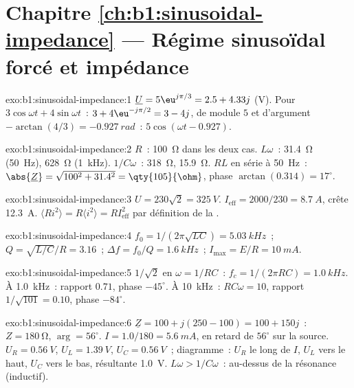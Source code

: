 \section*{Chapitre \ref{ch:b1:sinusoidal-impedance} --- Régime sinusoïdal forcé et impédance}

\begin{solution}{exo:b1:sinusoidal-impedance:1}
$\underline U = 5\eu^{j\pi/3} = 2.5 + 4.33j$ (V). Pour $3\cos\omega t +
4\sin\omega t$~: $3 + 4\eu^{-j\pi/2} = 3 - 4j$, de module $5$ et
d'argument $-\arctan(4/3) = \qty{-0.927}{rad}$~: $5\cos(\omega t - 0.927)$.
\end{solution}

\begin{solution}{exo:b1:sinusoidal-impedance:2}
$R$~: \qty{100}{\ohm} dans les deux cas. $L\omega$~: \qty{31.4}{\ohm} (\qty{50}{Hz}),
\qty{628}{\ohm} (\qty{1}{kHz}). $1/C\omega$~: \qty{318}{\ohm}, \qty{15.9}{\ohm}.
$RL$ en série à \qty{50}{Hz}~: $\abs{\underline Z} = \sqrt{100^2 + 31.4^2} =
\qty{105}{\ohm}$, phase $\arctan(0.314) = 17^\circ$.
\end{solution}

\begin{solution}{exo:b1:sinusoidal-impedance:3}
$U = 230\sqrt2 = \qty{325}{V}$. $I_{\mathrm{eff}} = 2000/230 = \qty{8.7}{A}$,
crête \qty{12.3}{A}. $\langle Ri^2\rangle = R\langle i^2\rangle =
RI_{\mathrm{eff}}^2$ par définition de la .
\end{solution}

\begin{solution}{exo:b1:sinusoidal-impedance:4}
$f_0 = 1/(2\pi\sqrt{LC}) = \qty{5.03}{kHz}$~; $Q = \sqrt{L/C}/R = 3.16$~;
$\Delta f = f_0/Q = \qty{1.6}{kHz}$~; $I_{\max} = E/R = \qty{10}{mA}$.
\end{solution}

\begin{solution}{exo:b1:sinusoidal-impedance:5}
$1/\sqrt2$ en $\omega = 1/RC$~: $f_c = 1/(2\pi RC) = \qty{1.0}{kHz}$. À
\qty{1.0}{kHz}~: rapport $0.71$, phase $-45^\circ$. À \qty{10}{kHz}~:
$RC\omega = 10$, rapport $1/\sqrt{101} = 0.10$, phase $-84^\circ$.
\end{solution}

\begin{solution}{exo:b1:sinusoidal-impedance:6}
$\underline Z = 100 + j(250 - 100) = 100 + 150j$~: $Z = \qty{180}{\ohm}$,
$\arg = 56^\circ$. $I = 1.0/180 = \qty{5.6}{mA}$, en retard de $56^\circ$
sur la source. $U_R = \qty{0.56}{V}$, $U_L = \qty{1.39}{V}$, $U_C = \qty{0.56}{V}$~;
diagramme~: $U_R$ le long de $I$, $U_L$ vers le haut, $U_C$ vers le bas,
résultante \qty{1.0}{V}. $L\omega > 1/C\omega$~: au-dessus de la
résonance (inductif).
\end{solution}

